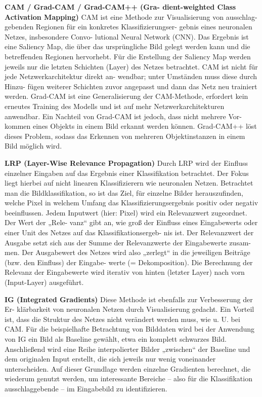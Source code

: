 \documentclass[11pt,a4paper]{article}
\numberwithin{equation}{section}
\begin{document}
	\noindent \textbf{CAM / Grad-CAM / Grad-CAM++ (Gra-
		dient-weighted Class Activation Mapping)}
	CAM ist eine Methode zur Visualisierung von ausschlag-
	gebenden Regionen für ein konkretes Klassifizierungser-
	gebnis eines neuronalen Netzes, insbesondere Convo-
	lutional Neural Network (CNN). Das Ergebnis ist eine
	Saliency Map, die über das ursprüngliche Bild gelegt
	werden kann und die betreffenden Regionen hervorhebt.
	Für die Erstellung der Saliency Map werden jeweils nur
	die letzten Schichten (Layer) des Netzes betrachtet.
	CAM ist nicht für jede Netzwerkarchitektur direkt an-
	wendbar; unter Umständen muss diese durch Hinzu-
	fügen weiterer Schichten zuvor angepasst und dann das
	Netz neu trainiert werden.
	Grad-CAM ist eine Generalisierung der CAM-Methode,
	erfordert kein erneutes Training des Modells und ist auf
	mehr Netzwerkarchitekturen anwendbar. Ein Nachteil
	von Grad-CAM ist jedoch, dass nicht mehrere Vor-
	kommen eines Objekts in einem Bild erkannt werden
	können. Grad-CAM++ löst dieses Problem, sodass das
	Erkennen von mehreren Objektinstanzen in einem Bild
	möglich wird.
	
	
	\noindent \textbf{LRP (Layer-Wise Relevance Propagation)}
	Durch LRP wird der Einfluss einzelner Eingaben auf das
		Ergebnis einer Klassifikation betrachtet. Der Fokus liegt
		hierbei auf nicht linearen Klassifizierern wie neuronalen
		Netzen. Betrachtet man die Bildklassifikation, so ist das
		Ziel, für einzelne Bilder herauszufinden, welche Pixel in
		welchem Umfang das Klassifizierungsergebnis positiv
		oder negativ beeinflussen. Jedem Inputwert (hier: Pixel)
		wird ein Relevanzwert zugeordnet. Der Wert der „Rele-
		vanz“ gibt an, wie groß der Einfluss eines Eingabewerts
		oder einer Unit des Netzes auf das Klassifikationsergeb-
		nis ist. Der Relevanzwert der Ausgabe setzt sich aus der
		Summe der Relevanzwerte der Eingabewerte zusam-
		men. Der Ausgabewert des Netzes wird also „zerlegt“ in
		die jeweiligen Beiträge (bzw. den Einfluss) der Eingabe-
		werte (= Dekomposition). Die Berechnung der Relevanz
		der Eingabewerte wird iterativ von hinten (letzter Layer)
		nach vorn (Input-Layer) ausgeführt.
	
	\noindent\textbf{IG (Integrated Gradients)}
	Diese Methode ist ebenfalls zur Verbesserung der Er-
	klärbarkeit von neuronalen Netzen durch Visualisierung
	gedacht. Ein Vorteil ist, dass die Struktur des Netzes
	nicht verändert werden muss, wie u. U. bei CAM. Für
	die beispielhafte Betrachtung von Bilddaten wird bei
	der Anwendung von IG ein Bild als Baseline gewählt,
	etwa ein komplett schwarzes Bild. Anschließend wird
	eine Reihe interpolierter Bilder „zwischen“ der Baseline
	und dem originalen Input erstellt, die sich jeweils nur
	wenig voneinander unterscheiden. Auf dieser Grundlage
	werden einzelne Gradienten berechnet, die wiederum
	genutzt werden, um interessante Bereiche – also für die
	Klassifikation ausschlaggebende – im Eingabebild zu
	identifizieren.
	
\end{document}
